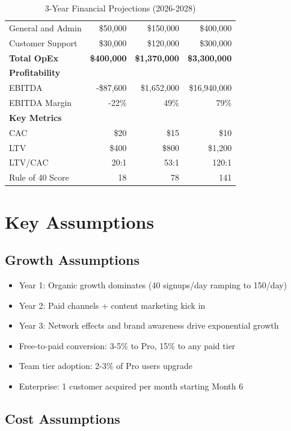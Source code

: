 \documentclass{report}
\begin{document}
\begin{table}[h]
\begin{tabular}{|l|r|r|r|}
General and Admin & \$50,000 & \$150,000 & \$400,000 \\
Customer Support & \$30,000 & \$120,000 & \$300,000 \\
\midrule
\textbf{Total OpEx} & \textbf{\$400,000} & \textbf{\$1,370,000} & \textbf{\$3,300,000} \\
\midrule
\multicolumn{4}{|l|}{\textbf{Profitability}} \\
EBITDA & -\$87,600 & \$1,652,000 & \$16,940,000 \\
EBITDA Margin & -22\% & 49\% & 79\% \\
\midrule
\multicolumn{4}{|l|}{\textbf{Key Metrics}} \\
CAC & \$20 & \$15 & \$10 \\
LTV & \$400 & \$800 & \$1,200 \\
LTV/CAC & 20:1 & 53:1 & 120:1 \\
Rule of 40 Score & 18 & 78 & 141 \\
\bottomrule
\end{tabular}
\caption{3-Year Financial Projections (2026-2028)}
\end{table}

\section{Key Assumptions}

\subsection{Growth Assumptions}

\begin{itemize}
    \item Year 1: Organic growth dominates (40 signups/day ramping to 150/day)
    \item Year 2: Paid channels + content marketing kick in
    \item Year 3: Network effects and brand awareness drive exponential growth
    \item Free-to-paid conversion: 3-5\% to Pro, 15\% to any paid tier
    \item Team tier adoption: 2-3\% of Pro users upgrade
    \item Enterprise: 1 customer acquired per month starting Month 6
\end{itemize}

\subsection{Cost Assumptions}
\end{document}
